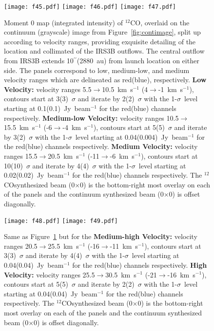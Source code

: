 \documentclass[twocolumn, 12pt]{aastex63}
\newcommand{\co}{$^{12}$CO}
\renewcommand{\arcsec}{$^{\prime\prime}$}
\newcommand{\cobeam}{0\farcs19$\times$0\farcs11}
\newcommand{\contbeam}{0\farcs11$\times$0\farcs05}
\begin{document}
\begin{figure}[H]
   \begin{center}
   \texttt{[image: f45.pdf]}
   \texttt{[image: f46.pdf]}
   \texttt{[image: f47.pdf]}
   \caption{Moment 0 map (integrated intensity) of \co, overlaid on the continuum (grayscale) image from Figure~\ref{fig:contimage}, split up according to velocity ranges, providing exquisite detailing of the location and collimated of the IRS3B outflows. The central outflow from IRS3B extends 10\arcsec\space(2880~au) from launch location on either side. The panels correspond to low, medium-low, and medium velocity ranges which are delineated as red(blue), respectively. \textbf{Low Velocity:} velocity ranges 5.5$\rightarrow$10.5~km~s$^{-1}$ (4$\rightarrow$-1~km~s$^{-1}$), contours start at 3(3)~$\sigma$ and iterate by 2(2)~$\sigma$ with the 1-$\sigma$~level starting at 0.1(0.1)~Jy~beam$^{-1}$ for the red(blue) channels respectively. \textbf{Medium-low Velocity:} velocity ranges 10.5$\rightarrow$15.5~km~s$^{-1}$ (-6$\rightarrow$-4~km~s$^{-1}$), contours start at 5(5)~$\sigma$ and iterate by 3(2)~$\sigma$ with the 1-$\sigma$~level starting at 0.04(0.004)~Jy~beam$^{-1}$ for the red(blue) channels respectively. \textbf{Medium Velocity:} velocity ranges 15.5$\rightarrow$20.5~km~s$^{-1}$ (-11$\rightarrow$-6~km~s$^{-1}$), contours start at 10(10)~$\sigma$ and iterate by 4(4)~$\sigma$ with the 1-$\sigma$~level starting at 0.02(0.02)~Jy~beam$^{-1}$ for the red(blue) channels respectively. The \co\space synthesized beam (\cobeam) is the bottom-right most overlay on each of the panels and the continuum synthesized beam (\contbeam) is offset diagonally.}\label{fig:comomentmap}
\end{center}
\end{figure}
\begin{figure}[H]
   \begin{center}
   \texttt{[image: f48.pdf]}
   \texttt{[image: f49.pdf]}
   \caption{Same as Figure~\ref{fig:comomentmap} but for the \textbf{Medium-high Velocity:} velocity ranges 20.5$\rightarrow$25.5~km~s$^{-1}$ (-16$\rightarrow$-11~km~s$^{-1}$), contours start at 3(3)~$\sigma$ and iterate by 4(4)~$\sigma$ with the 1-$\sigma$~level starting at 0.04(0.04)~Jy~beam$^{-1}$ for the red(blue) channels respectively. \textbf{High Velocity:} velocity ranges 25.5$\rightarrow$30.5~km~s$^{-1}$ (-21$\rightarrow$-16~km~s$^{-1}$), contours start at 5(5)~$\sigma$ and iterate by 2(2)~$\sigma$ with the 1-$\sigma$~level starting at 0.04(0.04)~Jy~beam$^{-1}$ for the red(blue) channels respectively. The \co\space synthesized beam (\cobeam) is the bottom-right most overlay on each of the panels and the continuum synthesized beam (\contbeam) is offset diagonally.}\label{fig:comomentmap2}
\end{center}
\end{figure}
\end{document}
